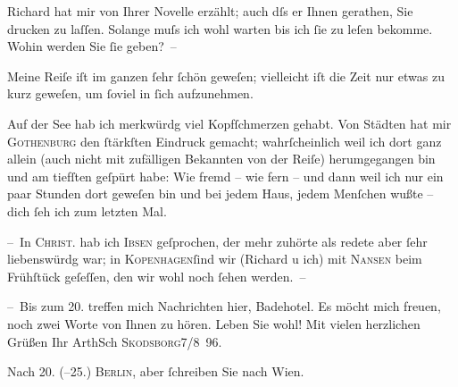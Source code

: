 \pstart
           Richard hat mir von Ihrer Novelle erzählt; auch dſs er Ihnen gerathen,
               Sie drucken zu laſſen. Solange muſs ich wohl warten bis ich ſie zu leſen
               bekomme. Wohin werden Sie ſie geben? –\pend
           
\pstart
           Meine Reiſe iſt im ganzen ſehr ſchön geweſen; vielleicht iſt die Zeit nur {\pb}etwas zu kurz geweſen, um ſoviel in ſich aufzunehmen.\pend
           
\pstart
           Auf der See hab ich merkwürdg viel Kopfſchmerzen gehabt. Von Städten hat mir \textsc{Gothenburg} den ſtärkſten Eindruck gemacht; wahrſcheinlich weil ich dort ganz allein (auch
               nicht mit zufälligen Bekannten von der Reiſe) herumgegangen bin und am tiefſten
               geſpürt habe: Wie fremd – wie fern – und dann weil ich nur ein paar Stunden dort
               geweſen bin und bei jedem Haus, jedem Menſchen {\pb}wußte –
               dich ſeh ich zum letzten Mal.\pend
           
\pstart
           – In \textsc{Christ}. hab ich \textsc{Ibsen} geſprochen, der mehr zuhörte als redete aber ſehr liebenswürdg war; in \textsc{Kopenhagen}ſind wir (Richard u ich) mit \textsc{Nansen} beim Frühſtück geſeſſen, den wir wohl noch ſehen werden. –\pend
           
\pstart
           – Bis zum 20. treffen mich Nachrichten hier, Badehotel. Es möcht mich freuen, noch zwei Worte von Ihnen zu
               hören.\pend
           \pstart Leben Sie wohl! Mit vielen herzlichen Grüßen Ihr \spacefill\mbox{ArthSch}\pend{}
\pstart
           \textsc{Skodsborg}7/8 96. \pend
           
\pstart
           Nach 20. (–25.) \textsc{Berlin}, aber ſchreiben Sie nach Wien.\pend
           \endnumbering{}  
      